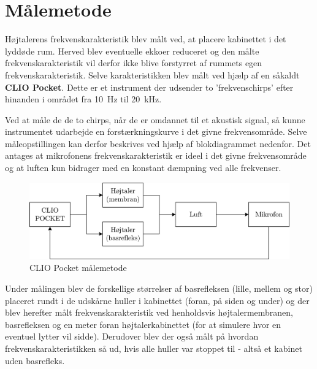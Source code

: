 \chapter{Målemetode}
Højtalerens frekvenskarakteristik blev målt ved, at placere kabinettet i det lyddøde rum. Herved blev eventuelle ekkoer reduceret og den målte frekvenskarakteristik vil derfor ikke blive forstyrret af rummets egen frekvenskarakteristik. Selve karakteristikken blev målt ved hjælp af en såkaldt \textbf{CLIO Pocket}. Dette er et instrument der udsender to 'frekvenschirps' efter hinanden i området fra \SI{10}{\hertz} til \SI{20}{\kilo\hertz}.

Ved at måle de de to chirps, når de er omdannet til et akustisk signal, så kunne instrumentet udarbejde en forstærkningskurve i det givne frekvensområde. Selve måleopstillingen kan derfor beskrives ved hjælp af blokdiagrammet nedenfor. Det antages at mikrofonens frekvenskarakteristik er ideel i det givne frekvensområde og at luften kun bidrager med en konstant dæmpning ved alle frekvenser.
\begin{figure}[H]
	\centering
	\includegraphics[width=\textwidth]{Pics/CLIOFeedback}
	\caption{CLIO Pocket målemetode}
\end{figure}

Under målingen blev de forskellige størrelser af basrefleksen (lille, mellem og stor) placeret rundt i de udskårne huller i kabinettet (foran, på siden og under) og der blev herefter målt frekvenskarakteristik ved henholdsvis højtalermembranen, basrefleksen og en meter foran højtalerkabinettet (for at simulere hvor en eventuel lytter vil sidde). Derudover blev der også målt på hvordan frekvenskarakteristikken så ud, hvis alle huller var stoppet til - altså et kabinet uden basrefleks.